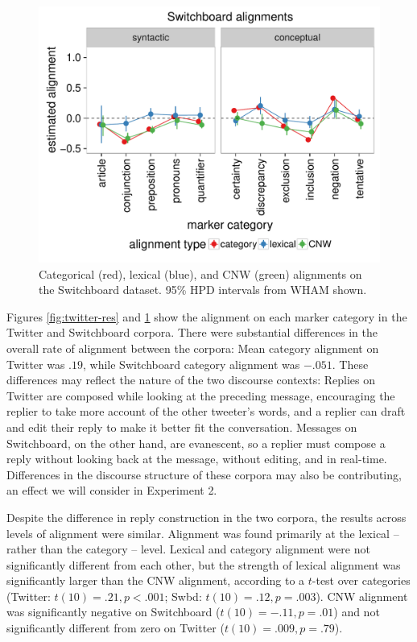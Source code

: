 \documentclass[11pt]{article}
\begin{document}
\begin{figure}[t]
  \begin{center}
    \includegraphics[width=\columnwidth]{results/swbda_line.pdf}
  \end{center}
  \caption{Categorical (red), lexical (blue), and CNW (green) alignments on the Switchboard dataset. 95\% HPD intervals from WHAM shown.}\label{fig:swbda-res}
\end{figure}

Figures \ref{fig:twitter-res} and \ref{fig:swbda-res} show the alignment on each marker category in the Twitter and Switchboard corpora. There were substantial differences in the overall rate of alignment between the corpora: Mean category alignment on Twitter was $.19$, while Switchboard category alignment was $-.051$. These differences may reflect the nature of the two discourse contexts: Replies on Twitter are composed while looking at the preceding message, encouraging the replier to take more account of the other tweeter's words, and a replier can draft and edit their reply to make it better fit the conversation.  Messages on Switchboard, on the other hand, are evanescent, so a replier must compose a reply without looking back at the message, without editing, and in real-time. Differences in the discourse structure of these corpora may also be contributing, an effect we will consider in Experiment 2.  %

Despite the difference in reply construction in the two corpora, the results across levels of alignment were similar. Alignment was found primarily at the lexical -- rather than the category -- level. Lexical and category alignment were not significantly different from each other, but the strength of lexical alignment was significantly larger than the CNW alignment, according to a $t$-test over categories (Twitter: $t(10)=.21, p<.001$; Swbd: $t(10)=.12,p=.003$). CNW alignment was significantly negative on Switchboard ($t(10)=-.11, p=.01$) and not significantly different from zero on Twitter ($t(10)=.009, p=.79$).
\end{document}
